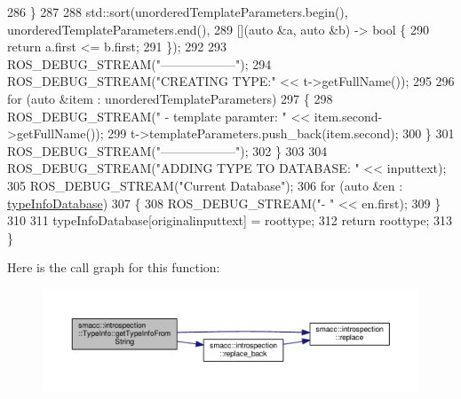 \begin{DoxyCode}
286         \}
287 
288         std::sort(unorderedTemplateParameters.begin(), unorderedTemplateParameters.end(),
289                   [](\textcolor{keyword}{auto} &a, \textcolor{keyword}{auto} &b) -> \textcolor{keywordtype}{bool} \{
290                       \textcolor{keywordflow}{return} a.first <= b.first;
291                   \});
292 
293         ROS\_DEBUG\_STREAM(\textcolor{stringliteral}{"------------------"});
294         ROS\_DEBUG\_STREAM(\textcolor{stringliteral}{"CREATING TYPE:"} << t->getFullName());
295 
296         \textcolor{keywordflow}{for} (\textcolor{keyword}{auto} &item : unorderedTemplateParameters)
297         \{
298             ROS\_DEBUG\_STREAM(\textcolor{stringliteral}{" - template paramter: "} << item.second->getFullName());
299             t->templateParameters.push\_back(item.second);
300         \}
301         ROS\_DEBUG\_STREAM(\textcolor{stringliteral}{"------------------"});
302     \}
303 
304     ROS\_DEBUG\_STREAM(\textcolor{stringliteral}{"ADDING TYPE TO DATABASE: "} << inputtext);
305     ROS\_DEBUG\_STREAM(\textcolor{stringliteral}{"Current Database"});
306     \textcolor{keywordflow}{for} (\textcolor{keyword}{auto} &en : \hyperlink{classsmacc_1_1introspection_1_1TypeInfo_ab780c03206b824aaf338135d16b0eff4}{typeInfoDatabase})
307     \{
308         ROS\_DEBUG\_STREAM(\textcolor{stringliteral}{"- "} << en.first);
309     \}
310 
311     typeInfoDatabase[originalinputtext] = roottype;
312     \textcolor{keywordflow}{return} roottype;
313 \}
\end{DoxyCode}


Here is the call graph for this function\+:\nopagebreak
\begin{figure}[H]
\begin{center}
\leavevmode
\includegraphics[width=350pt]{classsmacc_1_1introspection_1_1TypeInfo_a47d65b6c61499d7ae8ab9f6325c84837_cgraph}
\end{center}
\end{figure}




